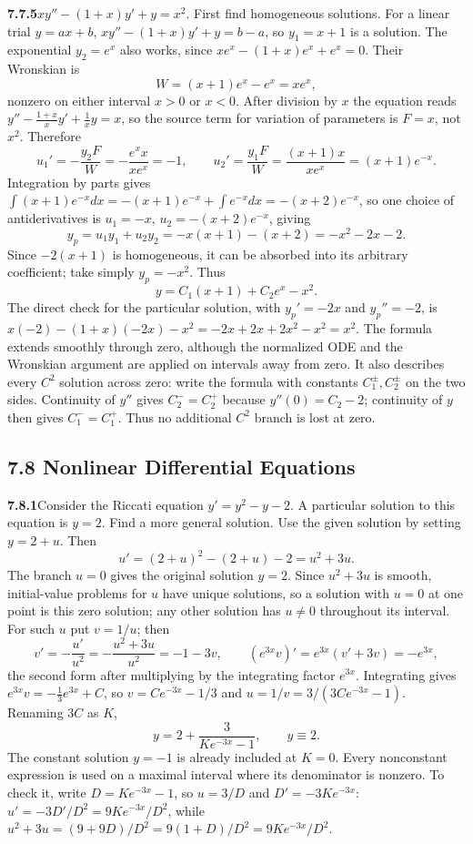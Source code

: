 \par\bigskip
\noindent\textbf{7.7.5}\quad $xy''-(1+x)y'+y=x^{2}$.
\solution
First find homogeneous solutions. For a linear trial $y=ax+b$,
$xy''-(1+x)y'+y=b-a$, so $y_1=x+1$ is a solution.
The exponential $y_2=e^x$ also works, since
$xe^x-(1+x)e^x+e^x=0$. Their Wronskian is
\[
W=(x+1)e^x-e^x=xe^x,
\]
nonzero on either interval $x>0$ or $x<0$.
After division by $x$ the equation reads
$y''-\frac{1+x}xy'+\frac1xy=x$, so the source term for variation of
parameters is $F=x$, not $x^2$. Therefore
\[
u_1'=-\frac{y_2F}W=-\frac{e^x x}{xe^x}=-1,\qquad
u_2'=\frac{y_1F}W=\frac{(x+1)x}{xe^x}=(x+1)e^{-x}.
\]
Integration by parts gives
$\int(x+1)e^{-x}dx=-(x+1)e^{-x}+\int e^{-x}dx=-(x+2)e^{-x}$, so one
choice of antiderivatives is
$u_1=-x$, $u_2=-(x+2)e^{-x}$, giving
\[
y_p=u_1y_1+u_2y_2=-x(x+1)-(x+2)=-x^2-2x-2.
\]
Since $-2(x+1)$ is homogeneous, it can be absorbed into its arbitrary
coefficient; take simply $y_p=-x^2$. Thus
\[
\boxed{y=C_1(x+1)+C_2e^x-x^2}.
\]
The direct check for the particular solution, with $y_p'=-2x$ and
$y_p''=-2$, is $x(-2)-(1+x)(-2x)-x^2=-2x+2x+2x^2-x^2=x^2$.
The formula extends smoothly through zero, although the normalized ODE
and the Wronskian argument are applied on intervals away from zero.
It also describes every $C^2$ solution across zero: write the formula
with constants $C_1^\pm,C_2^\pm$ on the two sides. Continuity of $y''$
gives $C_2^-=C_2^+$ because $y''(0)=C_2-2$; continuity of $y$ then
gives $C_1^-=C_1^+$. Thus no additional $C^2$ branch is lost at zero.

\subsection*{7.8 Nonlinear Differential Equations}

\par\bigskip
\noindent\textbf{7.8.1}\quad Consider the Riccati equation
$y'=y^{2}-y-2$. A particular solution to this equation is $y=2$. Find a more
general solution.
\solution
Use the given solution by setting $y=2+u$. Then
\[
u'=(2+u)^2-(2+u)-2=u^2+3u.
\]
The branch $u=0$ gives the original solution $y=2$. Since $u^2+3u$ is
smooth, initial-value problems for $u$ have unique solutions, so a
solution with $u=0$ at one point is this zero solution; any other
solution has $u\ne0$ throughout its interval. For such $u$ put
$v=1/u$; then
\[
v'=-\frac{u'}{u^2}=-\frac{u^2+3u}{u^2}=-1-3v,\qquad
(e^{3x}v)'=e^{3x}(v'+3v)=-e^{3x},
\]
the second form after multiplying by the integrating factor $e^{3x}$.
Integrating gives $e^{3x}v=-\frac13e^{3x}+C$, so $v=Ce^{-3x}-1/3$ and
$u=1/v=3/(3Ce^{-3x}-1)$. Renaming $3C$ as $K$,
\[
\boxed{y=2+\frac3{Ke^{-3x}-1}},\qquad \boxed{y\equiv2}.
\]
The constant solution $y=-1$ is already included at $K=0$.
Every nonconstant expression is used on a maximal interval where its
denominator is nonzero. To check it, write $D=Ke^{-3x}-1$, so $u=3/D$
and $D'=-3Ke^{-3x}$:
$u'=-3D'/D^2=9Ke^{-3x}/D^2$, while
$u^2+3u=(9+9D)/D^2=9(1+D)/D^2=9Ke^{-3x}/D^2$.

